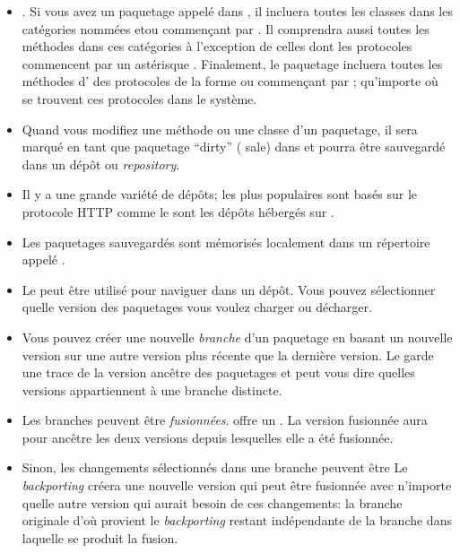 \documentclass[a4paper,10pt,twoside]{book}
\begin{document}
\begin{itemize}
\item \MC {}.
Si vous avez un paquetage appelé  dans \MC, il incluera toutes
les classes dans les catégories nommées   et\/ou commençant
par  . Il comprendra aussi toutes les méthodes dans ces
catégories à l'exception de celles dont les protocoles commencent par
un astérisque \ct{*}. 
Finalement, le paquetage incluera toutes les méthodes
d' des protocoles de la forme  
ou commençant par  ;  qu'importe où se trouvent ces
protocoles dans le système.

\item Quand vous modifiez une méthode ou une classe d'un paquetage, il
  sera marqué en tant que paquetage ``dirty'' (\ie{} sale) dans \MC et
  pourra être sauvegardé dans un dépôt ou \emph{repository}.

\item Il y a une grande variété de dépôts; les plus populaires sont
  basés sur le protocole HTTP comme le sont les dépôts hébergés sur
 \sqsrc.

\item Les paquetages sauvegardés sont mémorisés localement dans un
  répertoire appelé .

\item Le \MC \RI peut être utilisé pour naviguer dans un dépôt. Vous
  pouvez sélectionner quelle version des paquetages vous voulez
  charger ou décharger.

\item Vous pouvez créer une nouvelle \emph{branche} d'un paquetage
  en basant un nouvelle version sur une autre version plus récente que
  la dernière version. Le \RI garde une trace de la version ancêtre des
  paquetages et peut vous dire quelles versions appartiennent à une
  branche distincte.

\item Les branches peuvent être  \emph{fusionnées}. \MC offre un
  . %
La version fusionnée aura pour ancêtre les deux versions depuis
lesquelles elle a été fusionnée.

\item Sinon, les changements sélectionnés dans une branche peuvent
  être  Le \emph{backporting} %
créera une nouvelle version qui peut être fusionnée avec n'importe
quelle autre version qui aurait besoin de ces changements: la branche
originale d'où provient le \emph{backporting} restant indépendante de
la branche dans laquelle se produit la fusion.


\end{itemize}
\end{document}
